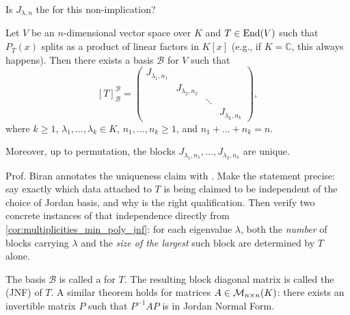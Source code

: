 \begin{question}
Is $J_{\lambda, n}$ the  for this non-implication?
\end{question}

\begin{theorem}
\label{thm:jordan_normal_form}
Let $V$ be an $n$-dimensional vector space over $K$ and $T \in \operatorname{End}(V)$ such that $P_T(x)$ splits as a product of linear factors in $K[x]$ (e.g., if $K = \mathbb{C}$, this always happens). Then there exists a basis $\mathcal{B}$ for $V$ such that
\[
[T]_{\mathcal{B}}^{\mathcal{B}} = \begin{pmatrix} J_{\lambda_1, n_1} & & & \\ & J_{\lambda_2, n_2} & & \\ & & \ddots & \\ & & & J_{\lambda_k, n_k} \end{pmatrix},
\]
where $k \ge 1$, $\lambda_1, \dots, \lambda_k \in K$, $n_1, \dots, n_k \ge 1$, and $n_1 + \dots + n_k = n$.

Moreover, up to permutation, the blocks $J_{\lambda_1, n_1}, \dots, J_{\lambda_k, n_k}$ are unique.
\end{theorem}

\begin{exercise}
\label{exc:jnf_uniqueness_meaning}
Prof. Biran annotates the uniqueness claim with . Make the statement precise: say exactly which data attached to $T$ is being claimed to be independent of the choice of Jordan basis, and why  is the right qualification. Then verify two concrete instances of that independence directly from \cref{cor:multiplicities_min_poly_jnf}: for each eigenvalue $\lambda$, both the \emph{number} of blocks carrying $\lambda$ and the \emph{size of the largest} such block are determined by $T$ alone.
\end{exercise}

\begin{remark}
\label{rem:jordan_basis}
The basis $\mathcal{B}$ is called a  for $T$. The resulting block diagonal matrix is called the  (JNF) of $T$. A similar theorem holds for matrices $A \in \mathcal{M}_{n \times n}(K)$: there exists an invertible matrix $P$ such that $P^{-1} A P$ is in Jordan Normal Form.
\end{remark}

